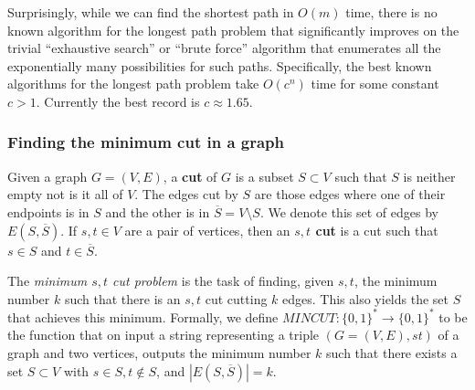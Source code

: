 \documentclass{article}
\begin{document}
  Surprisingly, while we can find the shortest path in $O(m)$ time, there is no known algorithm for the longest path problem that significantly improves on the trivial “exhaustive search” or “brute force” algorithm that enumerates all the exponentially many possibilities for such paths. Specifically, the best known algorithms for the longest path problem take $O(c^n)$ time for some constant $c > 1$. Currently the best record is $c \approx 1.65$. 

  \subsubsection{Finding the minimum cut in a graph}
  \begin{definition}
  Given a graph $G = (V, E)$, a \textbf{cut} of $G$ is a subset $S \subset V$ such that $S$ is neither empty not is it all of $V$. The edges cut by $S$ are those edges where one of their endpoints is in $S$ and the other is in $\overline{S} = V \setminus S$. We denote this set of edges by $E(S, \overline{S})$. If $s, t \in V$ are a pair of vertices, then an \textbf{$s, t$ cut} is a cut such that $s \in S$ and $t \in \overline{S}$. 
  \end{definition}

  The \textit{minimum $s, t$ cut problem} is the task of finding, given $s, t$, the minimum number $k$ such that there is an $s, t$ cut cutting $k$ edges. This also yields the set $S$ that achieves this minimum. Formally, we define $MINCUT: \{0,1\}^* \longrightarrow \{0,1\}^*$ to be the function that on input a string representing a triple $(G = (V, E), s t)$ of a graph and two vertices, outputs the minimum number $k$ such that there exists a set $S \subset V$ with $s \in S, t \not\in S$, and $|E(S, \overline{S})| = k$. 
\end{document}
